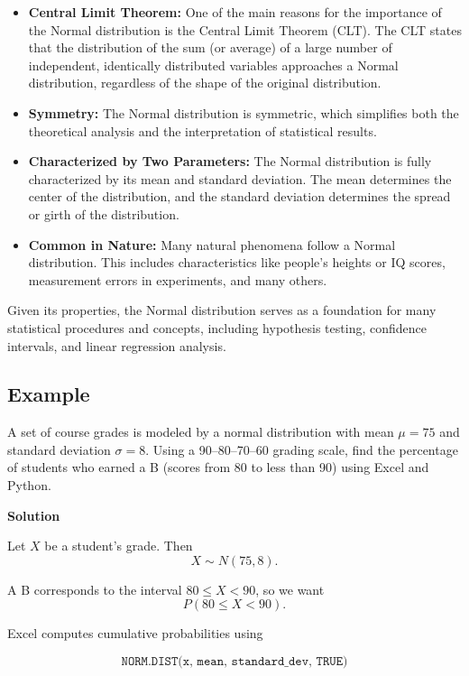 \begin{itemize}
\item \textbf{Central Limit Theorem:} One of the main reasons for the
  importance of the Normal distribution is the Central Limit Theorem
  (CLT). The CLT states that the distribution of the sum (or average)
  of a large number of independent, identically distributed variables
  approaches a Normal distribution, regardless of the shape of the
  original distribution.

\item \textbf{Symmetry:} The Normal distribution is symmetric, which
  simplifies both the theoretical analysis and the interpretation of
  statistical results.

\item \textbf{Characterized by Two Parameters:} The Normal
  distribution is fully characterized by its mean and standard
  deviation. The mean determines the center of the distribution, and
  the standard deviation determines the spread or girth of the
  distribution.

\item \textbf{Common in Nature:} Many natural phenomena follow a
  Normal distribution. This includes characteristics like people's
  heights or IQ scores, measurement errors in experiments, and many
  others.
\end{itemize}

Given its properties, the Normal distribution serves as a foundation
for many statistical procedures and concepts, including hypothesis
testing, confidence intervals, and linear regression analysis.

\subsection{Example}

A set of course grades is modeled by a normal distribution with mean $\mu = 75$
and standard deviation $\sigma = 8$. Using a 90--80--70--60 grading scale,
find the percentage of students who earned a B (scores from 80 to less than 90)
using Excel and Python.

\textbf{Solution}

Let $X$ be a student's grade. Then
\[
X \sim N(75,8).
\]

A B corresponds to the interval $80 \le X < 90$, so we want
\[
P(80 \le X < 90).
\]

Excel computes cumulative probabilities using

\[
\texttt{NORM.DIST(x, mean, standard\_dev, TRUE)}
\]

